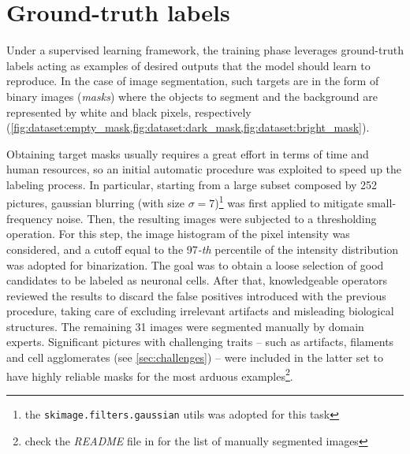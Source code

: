 \section{Ground-truth labels}
Under a supervised learning framework, the training phase leverages ground-truth labels acting as examples of desired outputs that the model should learn to reproduce. 
In the case of image segmentation, such targets are in the form of binary images (\textit{masks}) where the objects to segment and the background are represented by white and black pixels, respectively 
(\cref{fig:dataset:empty_mask,fig:dataset:dark_mask,fig:dataset:bright_mask}).

Obtaining target masks usually requires a great effort in terms of time and human resources, so an initial automatic procedure was exploited to speed up the labeling process. 
In particular, starting from a large subset composed by 252 pictures, gaussian blurring (with size $\sigma=7$)\footnote{the \texttt{skimage.filters.gaussian} utils was adopted for this task} was first applied to mitigate small-frequency noise. 
Then, the resulting images were subjected to a thresholding operation.
For this step, the image histogram of the pixel intensity was considered, and a cutoff equal to the 97\emph{-th} percentile of the intensity distribution was adopted for binarization. 
The goal was to obtain a loose selection of good candidates to be labeled as neuronal cells. 
After that, knowledgeable operators reviewed the results to discard the false positives introduced with the previous procedure, taking care of excluding irrelevant artifacts and misleading biological structures.
The remaining 31 images were segmented manually by domain experts. Significant pictures with challenging traits -- such as artifacts, filaments and cell agglomerates (see \cref{sec:challenges}) -- were included in the latter set to have highly reliable masks for the most arduous examples\footnote{check the \emph{README} file in  for the list of manually segmented images}. 




